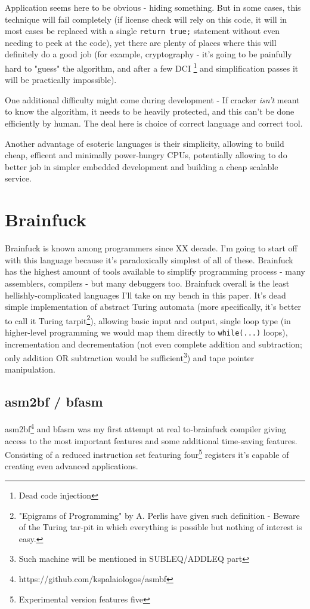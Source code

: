 \documentclass{article}
\begin{document}
\par Application seems here to be obvious - hiding something. But in some cases, this technique will fail completely (if license check will rely on this code, it will in most cases be replaced with a single \verb|return true;| statement without even needing to peek at the code), yet there are plenty of places where this will definitely do a good job (for example, cryptography - it's going to be painfully hard to "guess" the algorithm, and after a few DCI \footnote{Dead code injection} and simplification passes it will be practically impossible).

\par One additional difficulty might come during development - If cracker {\it isn't} meant to know the algorithm, it needs to be heavily protected, and this can't be done efficiently by human. The deal here is choice of correct language and correct tool.

\par Another advantage of esoteric languages is their simplicity, allowing to build cheap, efficent and minimally power-hungry CPUs, potentially allowing to do better job in simpler embedded development and building a cheap scalable service.

\section{Brainfuck}
\par Brainfuck is known among programmers since XX decade. I'm going to start off with this language because it's paradoxically simplest of all of these. Brainfuck has the highest amount of tools available to simplify programming process - many assemblers, compilers - but many debuggers too. Brainfuck overall is the least hellishly-complicated languages I'll take on my bench in this paper. It's dead simple implementation of abstract Turing automata (more specifically, it's better to call it Turing tarpit\footnote{"Epigrams of Programming" by A. Perlis have given such definition - {Beware of the Turing tar-pit in which everything is possible but nothing of interest is easy.}}), allowing basic input and output, single loop type (in higher-level programming we would map them directly to \verb|while(...)| loops), incrementation and decrementation (not even complete addition and subtraction; only addition OR subtraction would be sufficient\footnote{Such machine will be mentioned in SUBLEQ/ADDLEQ part}) and tape pointer manipulation.

\subsection{asm2bf / bfasm}
\par asm2bf\footnote{https://github.com/kspalaiologos/asmbf} and bfasm was my first attempt at real to-brainfuck compiler giving access to the most important features and some additional time-saving features. Consisting of a reduced instruction set featuring four\footnote{Experimental version features five} registers it's capable of creating even advanced applications.
\end{document}
